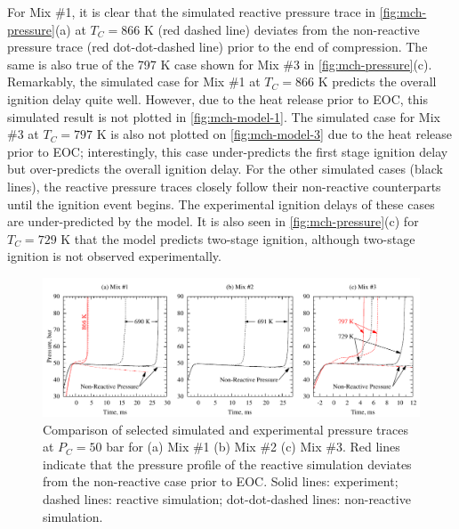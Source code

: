 \documentclass[12pt, letterpaper]{article}
\begin{document}
For Mix \#1, it is clear that the simulated reactive pressure trace in 
\autoref{fig:mch-pressure}(a) at $T_C=866$ K (red dashed line) deviates from 
the non-reactive pressure trace (red dot-dot-dashed line) prior to the end of 
compression. The same is also true of the 797 K case shown for Mix \#3 in 
\autoref{fig:mch-pressure}(c). Remarkably, the simulated case for Mix \#1 at 
$T_C=866$ K predicts the overall ignition delay quite well. However, due to the 
heat release prior to EOC, this simulated result is not plotted in 
\autoref{fig:mch-model-1}. The simulated case for Mix \#3 at $T_C=797$ K is also 
not plotted on \autoref{fig:mch-model-3} due to the heat release prior to EOC; 
interestingly, this case under-predicts the first stage ignition delay but 
over-predicts the overall ignition delay. For the other simulated cases (black 
lines), the reactive pressure traces closely follow their non-reactive 
counterparts until the ignition event begins. The experimental ignition delays 
of these cases are under-predicted by the model. It is also seen in 
\autoref{fig:mch-pressure}(c) for $T_C=729$ K that the model predicts two-stage 
ignition, although two-stage ignition is not observed experimentally.

\begin{figure}
    \centering
    \includegraphics[width=\textwidth]{../figures/05-MCH/mch-pressure}
    \caption{Comparison of selected simulated and experimental pressure traces 
        at $P_C=50$ bar for (a) Mix \#1 (b) Mix \#2 (c) Mix \#3. Red lines 
        indicate that the pressure profile of the reactive simulation deviates 
        from the non-reactive case prior to EOC. Solid lines: experiment; 
        dashed lines: reactive simulation; dot-dot-dashed lines: non-reactive 
        simulation.}
    \label{fig:mch-pressure}
\end{figure}
\end{document}
